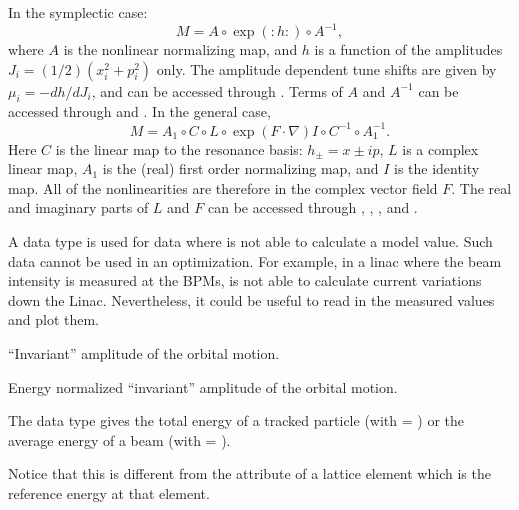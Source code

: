 \begin{description}
{In the symplectic case:
\begin{equation} \label{normalform1}
  M = A\circ \exp\left(:h:\right)\circ A^{-1},
\end{equation}
where $A$ is the nonlinear normalizing map, and $h$ is a function of the amplitudes $J_i =
(1/2)(x_i^2 + p_i^2)$ only. The amplitude dependent tune shifts are given by $\mu_i =
-dh/dJ_i$, and can be accessed through . Terms of $A$ and $A^{-1}$ can be
accessed through  and .  In the general case,
\begin{equation} \label{normalform2}
M = A_1\circ C \circ L \circ \exp\left(F\cdot\nabla\right)I\circ C^{-1} \circ A_1^{-1}.
\end{equation}
Here $C$ is the linear map to the resonance basis: $h_\pm = x \pm i p$, $L$ is a complex
linear map, $A_1$ is the (real) first order normalizing map, and $I$ is the identity
map. All of the nonlinearities are therefore in the complex vector field $F$. The real and
imaginary parts of $L$ and $F$ can be accessed through , ,
, and .

  \item[null] \Newline {}
A  data type is used for data where \tao is not able to calculate a model value. Such data
cannot be used in an optimization. For example, in a linac where the beam intensity is measured at
the BPMs, \tao is not able to calculate current variations down the Linac. Nevertheless, it
could be useful to read in the measured values and plot them.

  \item[orbit.amp_a, .amp_b] \Newline {}
``Invariant'' amplitude of the orbital motion.

  \item[orbit.norm_amp_a, .norm_amp_b] \Newline {}
Energy normalized ``invariant'' amplitude of the orbital motion.

  \item[orbit.energy] \Newline {}
The  data type gives the total energy of a tracked particle (with
 = ) or the average energy of a beam (with  =
).

Notice that this is different from the  attribute of a lattice element which
is the reference energy at that element.

}
\end{description}
